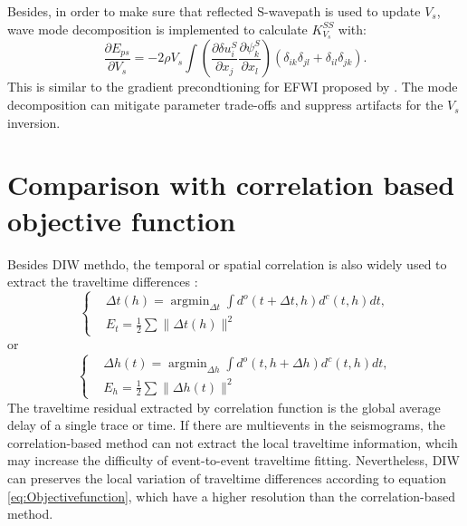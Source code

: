 Besides, in order to make sure that reflected S-wavepath is used to update $V_s$, wave mode decomposition 
is implemented to calculate $K^{SS}_{V_s}$ with:
\begin{equation}
	\frac{\partial E_{ps}}{\partial V_s}=-2\rho V_s
	\int (\frac{\partial \delta u^S_{i}}{\partial
    x_j}\frac{\partial \psi^S_{k}}{\partial x_l})
	(\delta_{ik}\delta_{jl}+
	\delta_{il}\delta_{jk}).
    \label{eq:GradientVel_MD}
\end{equation}
This is similar to the gradient precondtioning for EFWI proposed by \cite{WangEtAl2017}. The mode
decomposition can mitigate parameter trade-offs and suppress artifacts for the
$V_s$ inversion.
\section{Comparison with correlation based objective function}
Besides DIW methdo, the temporal or spatial correlation is also widely used to extract the
traveltime differences \cite[]{vanLeeuwen:2010,chi2015,Wang2015}:
\begin{equation}
\left\{
	\begin{aligned}
		&\Delta t(h)=\mathop{\arg\min}_{\Delta t}\int d^{o}(t+\Delta t,h)d^{c}(t,h)dt,\\
	&E_t=\frac{1}{2}\sum\parallel \Delta t(h)\parallel ^2
	\end{aligned}
	\right.
    \label{eq:Obj_TimeCorr} 
\end{equation}
or 
\begin{equation}
\left\{
	\begin{aligned}
		&\Delta h(t)=\mathop{\arg\min}_{\Delta h}\int d^{o}(t,h+\Delta h)d^{c}(t,h)dt,\\
	&E_h=\frac{1}{2}\sum\parallel \Delta h(t)\parallel ^2
	\end{aligned}
	\right.
    \label{eq:Obj_SpatialCorr} 
\end{equation}
The traveltime residual extracted by correlation function is the global average delay of a single trace or time.
If there are multievents in the seismograms, the correlation-based method can not extract the local traveltime information, 
whcih may increase the difficulty of event-to-event traveltime fitting.
Nevertheless, DIW can preserves the local variation of traveltime differences according to equation
\eqref{eq:Objectivefunction}, which have a higher resolution than the correlation-based method.

